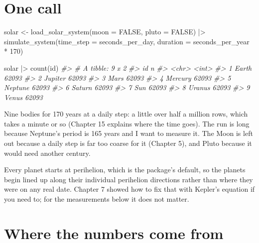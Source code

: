 \documentclass[
  10.5pt,
  letterpaper,
]{scrbook}
\newenvironment{Shaded}{\begin{snugshade}}{\end{snugshade}}
\newcommand{\AttributeTok}[1]{\textcolor[rgb]{0.00,0.00,0.00}{#1}}
\newcommand{\CommentTok}[1]{\textcolor[rgb]{0.00,0.00,0.00}{\textit{#1}}}
\newcommand{\ConstantTok}[1]{\textcolor[rgb]{0.00,0.00,0.00}{#1}}
\newcommand{\DecValTok}[1]{\textcolor[rgb]{0.00,0.00,0.00}{#1}}
\newcommand{\FunctionTok}[1]{\textcolor[rgb]{0.00,0.00,0.00}{#1}}
\newcommand{\NormalTok}[1]{\textcolor[rgb]{0.00,0.00,0.00}{#1}}
\newcommand{\OtherTok}[1]{\textcolor[rgb]{0.00,0.00,0.00}{#1}}
\newcommand{\SpecialCharTok}[1]{\textcolor[rgb]{0.00,0.00,0.00}{#1}}
\theoremstyle{plain}
\theoremstyle{remark}
\begin{document}
\section{One call}\label{one-call}

\begin{Shaded}
\begin{Highlighting}[]
\NormalTok{solar }\OtherTok{\textless{}{-}} \FunctionTok{load\_solar\_system}\NormalTok{(}\AttributeTok{moon =} \ConstantTok{FALSE}\NormalTok{, }\AttributeTok{pluto =} \ConstantTok{FALSE}\NormalTok{) }\SpecialCharTok{|\textgreater{}}
  \FunctionTok{simulate\_system}\NormalTok{(}\AttributeTok{time\_step =}\NormalTok{ seconds\_per\_day, }\AttributeTok{duration =}\NormalTok{ seconds\_per\_year }\SpecialCharTok{*} \DecValTok{170}\NormalTok{)}

\NormalTok{solar }\SpecialCharTok{|\textgreater{}} \FunctionTok{count}\NormalTok{(id)}
\CommentTok{\#\textgreater{} \# A tibble: 9 x 2}
\CommentTok{\#\textgreater{}   id          n}
\CommentTok{\#\textgreater{}   \textless{}chr\textgreater{}   \textless{}int\textgreater{}}
\CommentTok{\#\textgreater{} 1 Earth   62093}
\CommentTok{\#\textgreater{} 2 Jupiter 62093}
\CommentTok{\#\textgreater{} 3 Mars    62093}
\CommentTok{\#\textgreater{} 4 Mercury 62093}
\CommentTok{\#\textgreater{} 5 Neptune 62093}
\CommentTok{\#\textgreater{} 6 Saturn  62093}
\CommentTok{\#\textgreater{} 7 Sun     62093}
\CommentTok{\#\textgreater{} 8 Uranus  62093}
\CommentTok{\#\textgreater{} 9 Venus   62093}
\end{Highlighting}
\end{Shaded}

Nine bodies for 170 years at a daily step: a little over half a million
rows, which takes a minute or so (Chapter 15 explains where the time
goes). The run is long because Neptune's period is 165 years and I want
to measure it. The Moon is left out because a daily step is far too
coarse for it (Chapter 5), and Pluto because it would need another
century.

Every planet starts at perihelion, which is the package's default, so
the planets begin lined up along their individual perihelion directions
rather than where they were on any real date. Chapter 7 showed how to
fix that with Kepler's equation if you need to; for the measurements
below it does not matter.

\section{Where the numbers come from}\label{where-the-numbers-come-from}
\end{document}
